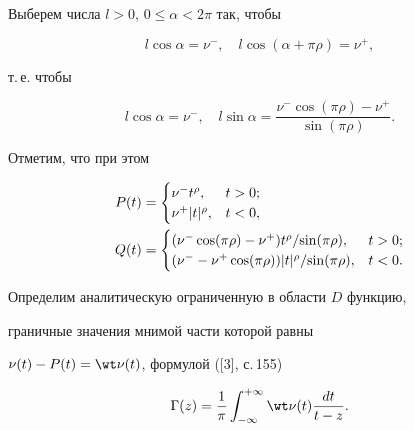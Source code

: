 Выберем числа $l>0$, $0\leq\alpha <2\pi $ так, чтобы


$$


l\cos\alpha =\nu^{-},\quad l\cos(\alpha +\pi\rho)=\nu^{+},


$$


т.\,е. чтобы


$$


l\cos\alpha = \nu^{-},\quad l\sin\alpha =


\frac{\nu^{-}\cos(\pi \rho) - \nu^{+}}{\sin(\pi \rho)}.


$$





Отметим, что при этом


\begin{align}


P(t) &=


\begin{cases}


\nu^{-}t^{\rho}, &   t > 0;\\


\nu^{+}|t|^{\rho}, & t < 0,


\end{cases} \notag \\


%


Q(t) &=


\begin{cases}


(\nu^{-}\cos(\pi \rho) -


\nu^{+})t^{\rho}/{\sin(\pi \rho)}, & t > 0;\\


(\nu^{-}-\nu^{+}\cos(\pi \rho))|t|^{\rho}/{\sin(\pi \rho)}, & t<0.


\end{cases}


\end{align}





Определим аналитическую ограниченную в области $D$ функцию,


граничные значения мнимой части которой равны


$\nu (t) - P(t) = \wt\nu (t)$, формулой ([3], с.\,155)


$$


\Gamma (z) = \frac{1}{\pi}\int_{-\infty}^{+\infty}\wt\nu (t)


\frac{dt}{t - z}.


$$





